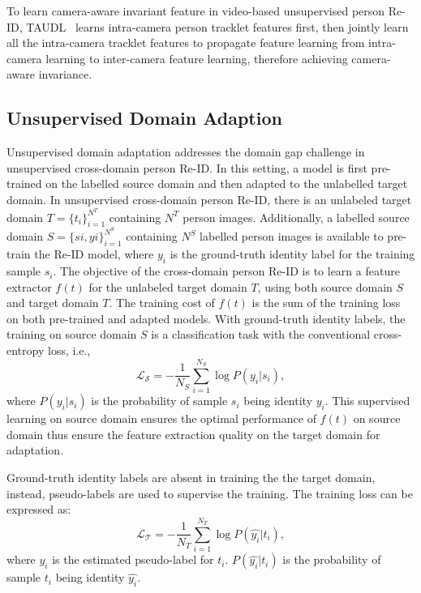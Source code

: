 \documentclass[a4paper,fleqn]{cas-dc}
\begin{document}
To learn camera-aware invariant feature in video-based unsupervised person Re-ID, TAUDL~\cite{ferrari_unsupervised_2018} learns intra-camera person tracklet features first, then jointly learn all the intra-camera tracklet features to propagate feature learning from intra-camera learning to inter-camera feature learning, therefore achieving camera-aware invariance. 

\subsection{Unsupervised Domain Adaption}\label{uda}

Unsupervised domain adaptation addresses the domain gap challenge in unsupervised cross-domain person Re-ID. In this setting, a model is first pre-trained on the labelled source domain and then adapted to the unlabelled target domain. In unsupervised cross-domain person Re-ID, there is an unlabeled target domain $T = \{t_i\}^{N^T}_{i=1}$ containing $N^T$ person images. Additionally, a labelled source domain $S = \{si, yi\}^{N^S}_{i=1}$ containing $N^S$ labelled person images is available to pre-train the Re-ID model, where $y_i$ is the ground-truth identity label for the training sample $s_i$. The objective of the cross-domain person Re-ID is to learn a feature extractor $f(t)$ for the unlabeled target domain $T$, using both source domain $S$ and target domain $T$. The training cost of $f(t)$ is the sum of the training loss on both pre-trained and adapted models. With ground-truth identity labels, the training on source domain $S$ is a classification task with the conventional cross-entropy loss, i.e.,
\begin{equation} \label{eq:eq4}
\mathcal{L_S} = -\frac{1}{N_S}\sum_{i=1}^{N_S} \log P(y_i|s_i),
\end{equation}
where $P(y_i|s_i)$ is the probability of sample $s_i$ being identity $y_i$.
This supervised learning on source domain ensures the optimal performance of $f(t)$ on source domain thus ensure the feature extraction quality on the target domain for adaptation.

Ground-truth identity labels are absent in training the the target domain, instead, pseudo-labels are used to supervise the training. The training loss can be expressed as:
\begin{equation} \label{eq:eq4}
\mathcal{L_T} = -\frac{1}{N_T}\sum_{i=1}^{N_T} \log P(\hat{y_i}|t_i),
\end{equation}
where $\hat{y_i}$ is the estimated pseudo-label for $t_i$.  $P(\hat{y_i}|t_i)$ is the probability of sample $t_i$ being identity $\hat{y_i}$. 
\end{document}
